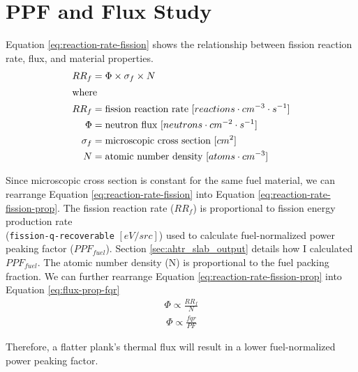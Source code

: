 \section{PPF and Flux Study}
Equation \ref{eq:reaction-rate-fission} shows the relationship between fission reaction rate, 
flux, and material properties. 
\begin{align}
\label{eq:reaction-rate-fission}
    RR_f &= \Phi \times \sigma_f \times N \\
\intertext{where}
    RR_f &= \mbox{fission reaction rate } [reactions \cdot cm^{-3} \cdot s^{-1}]\nonumber \\
    \Phi &= \mbox{neutron flux } [neutrons \cdot cm^{-2} \cdot s^{-1}] \nonumber \\
    \sigma_f &= \mbox{microscopic cross section } [cm^2] \nonumber \\
    N &= \mbox{atomic number density } [atoms \cdot cm^{-3}] \nonumber 
\end{align}

Since microscopic cross section is constant for the same fuel material, we can rearrange 
Equation \ref{eq:reaction-rate-fission} into Equation \ref{eq:reaction-rate-fission-prop}. 
The fission reaction rate ($RR_f$) is proportional to fission energy production rate \\
(\texttt{fission-q-recoverable} $[eV/src]$) used to calculate fuel-normalized power peaking 
factor ($PPF_{fuel}$). 
Section \ref{sec:ahtr_slab_output} details how I calculated $PPF_{fuel}$. 
The atomic number density (N) is proportional to the fuel packing fraction. 
We can further rearrange Equation \ref{eq:reaction-rate-fission-prop} into 
Equation \ref{eq:flux-prop-fqr}
\begin{align}
    \label{eq:reaction-rate-fission-prop}
    \Phi \propto \frac{RR_f}{N}
\end{align}
\begin{align}
    \label{eq:flux-prop-fqr}
    \Phi \propto \frac{fqr}{PF}
\end{align}

Therefore, a flatter plank's thermal flux will result in a lower fuel-normalized power peaking 
factor. 